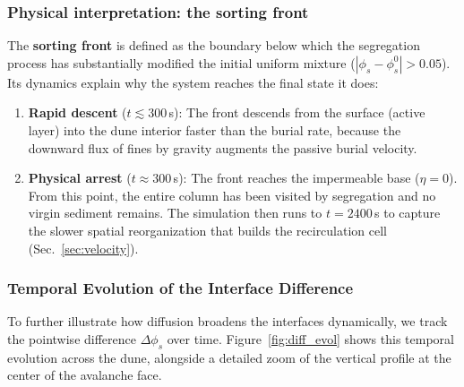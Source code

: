 \documentclass[12pt, a4paper]{article}
\begin{document}
\subsubsection*{Physical interpretation: the sorting front}

The \textbf{sorting front} is defined as the boundary below which the
segregation process has substantially modified the initial uniform mixture
($|\phi_s - \phi_s^0| > 0.05$). Its dynamics explain why the system
reaches the final state it does:
\begin{enumerate}
    \item \textbf{Rapid descent} ($t \lesssim 300$\,s): The front
          descends from the surface (active layer) into the dune interior
          faster than the burial rate, because the downward flux of fines
          by gravity augments the passive burial velocity.
    \item \textbf{Physical arrest} ($t \approx 300$\,s): The front
          reaches the impermeable base ($\eta = 0$). From this point, the
          entire column has been visited by segregation and no virgin sediment
          remains. The simulation then runs to $t = 2400$\,s to capture the
          slower spatial reorganization that builds the recirculation cell
          (Sec.~\ref{sec:velocity}).
\end{enumerate}

\subsubsection*{Temporal Evolution of the Interface Difference}

To further illustrate how diffusion broadens the interfaces dynamically, we track the pointwise difference $\Delta\phi_s$ over time. Figure~\ref{fig:diff_evol} shows this temporal evolution across the dune, alongside a detailed zoom of the vertical profile at the center of the avalanche face.
\end{document}
